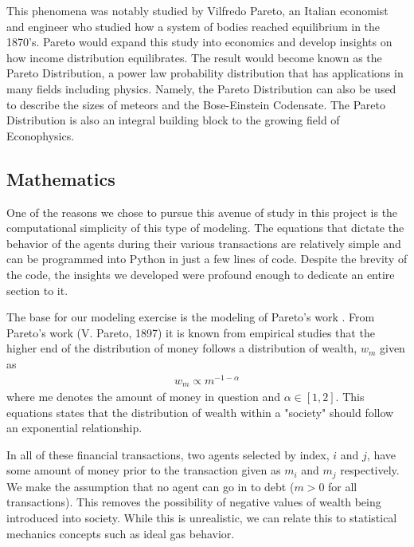 \documentclass[11pt]{article}
\newcommand{\ba}{\[\begin{aligned}}
\newcommand{\ea}{\end{aligned}\]}
\begin{document}
This phenomena was notably studied by Vilfredo Pareto, an Italian economist and engineer who studied how a system of bodies reached equilibrium in the 1870's. Pareto would expand this study into economics and develop insights on how income distribution equilibrates. The result would become known as the Pareto Distribution, a power law probability distribution that has applications in many fields including physics. Namely, the Pareto Distribution can also be used to describe the sizes of meteors and the Bose-Einstein Codensate. The Pareto Distribution is also an integral building block to the growing field of Econophysics.  \cite{pareto}

\subsection{Mathematics} \label{math}
One of the reasons we chose to pursue this avenue of study in this project is the computational simplicity of this type of modeling. The equations that dictate the behavior of the agents during their various transactions are relatively simple and can be programmed into Python in just a few lines of code. Despite the brevity of the code, the insights we developed were profound enough to dedicate an entire section to it.

The base for our modeling exercise is the modeling of Pareto's work \cite{pareto}. From Pareto’s work (V. Pareto, 1897) it is known from empirical studies that the higher end of the distribution of money follows a distribution of wealth, $w_m$ given as
\ba
w_m \propto m^{-1-\alpha}
\ea
where me denotes the amount of money in question and $\alpha \in [1,2]$. This equations states that the distribution of wealth within a "society" should follow an exponential relationship. 

In all of these financial transactions, two agents selected by index, $i$ and $j$, have some amount of money prior to the transaction given as $m_i$ and $m_j$ respectively. We make the assumption that no agent can go in to debt ($m>0$ for all transactions). This removes the possibility of negative values of wealth being introduced into society. While this is unrealistic, we can relate this to statistical mechanics concepts such as ideal gas behavior.
\end{document}

